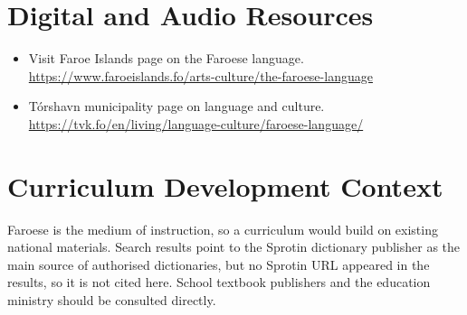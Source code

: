 \documentclass[12pt]{article}
\begin{document}
\section{Digital and Audio Resources}
\begin{itemize}
\item Visit Faroe Islands page on the Faroese language. \url{https://www.faroeislands.fo/arts-culture/the-faroese-language}
\item T\'orshavn municipality page on language and culture. \url{https://tvk.fo/en/living/language-culture/faroese-language/}
\end{itemize}

\section{Curriculum Development Context}
Faroese is the medium of instruction, so a curriculum would build on existing national materials. Search results point to the Sprotin dictionary publisher as the main source of authorised dictionaries, but no Sprotin URL appeared in the results, so it is not cited here. School textbook publishers and the education ministry should be consulted directly.
\end{document}
